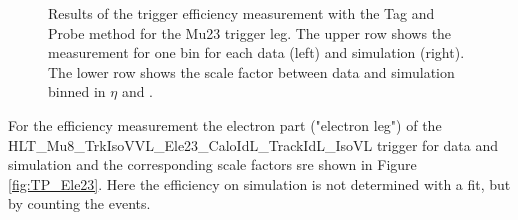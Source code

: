 \begin{figure}[htbp!]
\begin{center}
      \caption{Results of the trigger efficiency measurement with the Tag and Probe method for the Mu23 trigger leg. The upper row shows the measurement for one bin for each data (left) and simulation (right). The lower row shows 
       the scale factor between data and simulation binned in $\eta$ and \pt. }  
    \label{fig:TP_Mu23}
  \end{center}
\end{figure}

For the efficiency measurement the electron part ("electron leg") of the\\ HLT\_Mu8\_TrkIsoVVL\_Ele23\_CaloIdL\_TrackIdL\_IsoVL trigger for data and simulation and the corresponding scale factors sre shown in Figure \ref{fig:TP_Ele23}.
Here the efficiency on simulation is not determined with a fit, but by counting the events.


